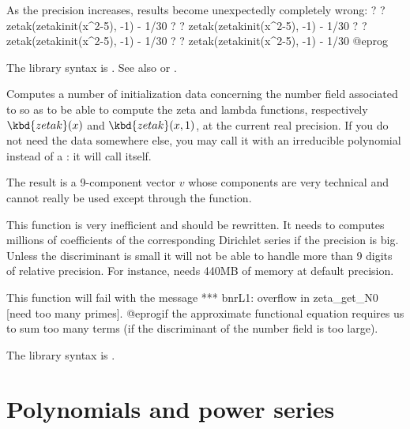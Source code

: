 \item As the precision increases, results become unexpectedly
completely wrong:
\bprog
? 
? zetak(zetakinit(x^2-5), -1) - 1/30
? 
? zetak(zetakinit(x^2-5), -1) - 1/30
? 
? zetak(zetakinit(x^2-5), -1) - 1/30
? 
? zetak(zetakinit(x^2-5), -1) - 1/30
@eprog

The library syntax is .
See also  or
.

\label{se:zetakinit}
Computes a number of initialization data
concerning the number field associated to  so as to be able
to compute the  zeta and lambda functions, respectively
$\kbd{zetak}(x)$ and $\kbd{zetak}(x,1)$, at the current real precision. If
you do not need the  data somewhere else, you may call it
with an irreducible polynomial instead of a : it will call
 itself.

The result is a 9-component vector $v$ whose components are very technical
and cannot really be used except through the  function.

This function is very inefficient and should be rewritten. It needs to
computes millions of coefficients of the corresponding Dirichlet series if
the precision is big. Unless the discriminant is small it will not be able
to handle more than 9 digits of relative precision. For instance,
 needs 440MB of memory at default precision.

This function will fail with the message
\bprog
 *** bnrL1: overflow in zeta_get_N0 [need too many primes].
@eprog\noindent if the approximate functional equation requires us to sum
too many terms (if the discriminant of the number field is too large).

The library syntax is .

\section{Polynomials and power series}

